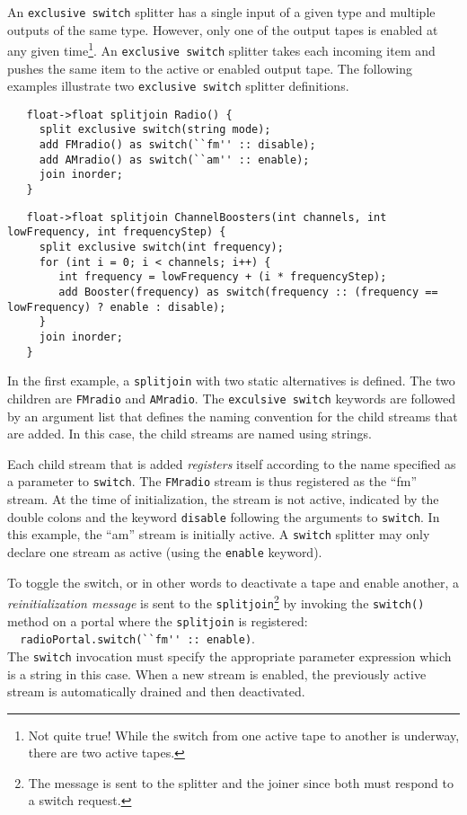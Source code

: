 \documentclass{tr}
\begin{document}
An \texttt{exclusive  switch} splitter has  a single input of  a given
type and multiple  outputs of the same type. However,  only one of the
output  tapes is enabled  at any  given time\footnote{Not  quite true!
While the  switch from one active  tape to another  is underway, there
are two  active tapes.}.  An \texttt{exclusive  switch} splitter takes
each incoming item  and pushes the same item to  the active or enabled
output tape.  The  following examples illustrate two \texttt{exclusive
switch} splitter definitions.
\begin{verbatim}
   float->float splitjoin Radio() {
     split exclusive switch(string mode);
     add FMradio() as switch(``fm'' :: disable);
     add AMradio() as switch(``am'' :: enable);
     join inorder;
   }
\end{verbatim}

\begin{verbatim}
   float->float splitjoin ChannelBoosters(int channels, int lowFrequency, int frequencyStep) {
     split exclusive switch(int frequency);
     for (int i = 0; i < channels; i++) {
        int frequency = lowFrequency + (i * frequencyStep);
        add Booster(frequency) as switch(frequency :: (frequency == lowFrequency) ? enable : disable);
     }
     join inorder;
   }
\end{verbatim}

In the first example,  a \verb+splitjoin+ with two static alternatives
is    defined.    The   two    children    are   \verb+FMradio+    and
\verb+AMradio+. The \texttt{exculsive switch} keywords are followed by
an  argument list  that defines  the naming  convention for  the child
streams  that are added.  In this  case, the  child streams  are named
using strings.

Each child  stream that is  added {\it registers} itself  according to
the name specified as a parameter to \verb+switch+. The \verb+FMradio+
stream  is  thus registered  as  the ``fm''  stream.  At  the time  of
initialization,  the stream  is not  active, indicated  by  the double
colons  and  the keyword  \verb+disable+  following  the arguments  to
\verb+switch+.   In  this  example,  the ``am''  stream  is  initially
active. A \verb+switch+ splitter may only declare one stream as active
(using the \verb+enable+ keyword).

To  toggle the  switch, or  in other  words to  deactivate a  tape and
enable  another,  a {\it  reinitialization  message}  is  sent to  the
\verb+splitjoin+\footnote{The message is sent  to the splitter and the
joiner since both  must respond to a switch  request.} by invoking the
\verb+switch()+  method  on a  portal  where  the \verb+splitjoin+  is
registered:\\
\verb+  radioPortal.switch(``fm'' :: enable)+.\\
The \texttt{switch} invocation  must specify the appropriate parameter
expression  which is  a string  in this  case.  When  a new  stream is
enabled,  the previously  active stream  is automatically  drained and
then deactivated.
\end{document}
